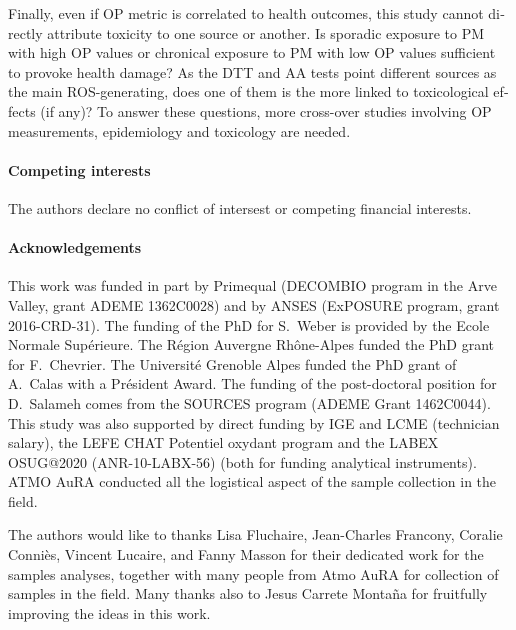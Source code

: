 \begin{otherlanguage}{english}
Finally, even if OP metric is correlated to health outcomes, this study
cannot directly attribute toxicity to one source or another. Is sporadic
exposure to PM with high OP values or chronical exposure to PM with low OP
values sufficient to provoke health damage?  As the DTT and AA tests point
different sources as the main ROS-generating, does one of them is the more
linked to toxicological effects (if any)?
To answer these questions, more cross-over studies involving OP measurements,
epidemiology and toxicology are needed.


\paragraph{Competing interests}
The authors declare no conflict of intersest or competing financial interests.


\paragraph{Acknowledgements}
This work was funded in part by Primequal (DECOMBIO program in the Arve Valley,
grant ADEME 1362C0028) and by ANSES (ExPOSURE program, grant 2016-CRD-31). The
funding of the PhD for S.~Weber is provided by the Ecole Normale Sup\'{e}rieure.
The R\'{e}gion Auvergne Rh\^{o}ne-Alpes funded the PhD grant for F.~Chevrier. The
Universit\'{e} Grenoble Alpes funded the PhD grant of A.~Calas with a
Pr\'{e}sident Award. The funding of the post-doctoral position for D.~Salameh
comes from the SOURCES program (ADEME Grant 1462C0044). This study was also
supported by direct funding by IGE and LCME (technician salary), the LEFE CHAT
Potentiel oxydant program and the LABEX OSUG@2020 (ANR-10-LABX-56) (both for
funding analytical instruments).  ATMO AuRA conducted all the logistical aspect
of the sample collection in the field.

The authors would like to thanks Lisa Fluchaire, Jean-Charles Francony, Coralie
Conni\`{e}s, Vincent Lucaire, and Fanny Masson for their dedicated work for the
samples analyses, together with many people from Atmo AuRA for collection of
samples in the field. Many thanks also to Jesus Carrete Monta\~{n}a for fruitfully
improving the ideas in this work.

\end{otherlanguage}
\clearpage

